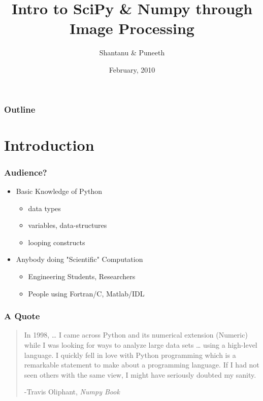 \documentclass[presentation]{beamer}
\begin{document}
\title{Intro to SciPy \& Numpy \newline through Image Processing}
\author{Shantanu \& Puneeth}
\date{February, 2010}
\maketitle

\begin{frame}
\frametitle{Outline}
\setcounter{tocdepth}{3}
\tableofcontents
\end{frame}







\section{Introduction}
\label{sec-1}
\begin{frame}
\frametitle{Audience?}
\label{sec-1_1}
\begin{itemize}

\item Basic Knowledge of Python
\label{sec-1_1_1}%
\begin{itemize}
\item data types
\item variables, data-structures
\item looping constructs
\end{itemize}

\item Anybody doing "Scientific" Computation
\label{sec-1_1_2}%
\begin{itemize}
\item Engineering Students, Researchers
\item People using Fortran/C, Matlab/IDL
\end{itemize}
\end{itemize} %
\end{frame}
\begin{frame}
\frametitle{A Quote}
\label{sec-1_2}

\begin{quote}
In 1998, \ldots{} I came across Python and its numerical extension
(Numeric) while I was looking for ways to analyze large data sets
\ldots{} using a high-level language. I quickly fell in love with Python
programming which is a remarkable statement to make about a
programming language. If I had not seen others with the same view,
I might have seriously doubted my sanity.

-Travis Oliphant, \emph{Numpy Book}
\end{quote}
\end{frame}
\end{document}
